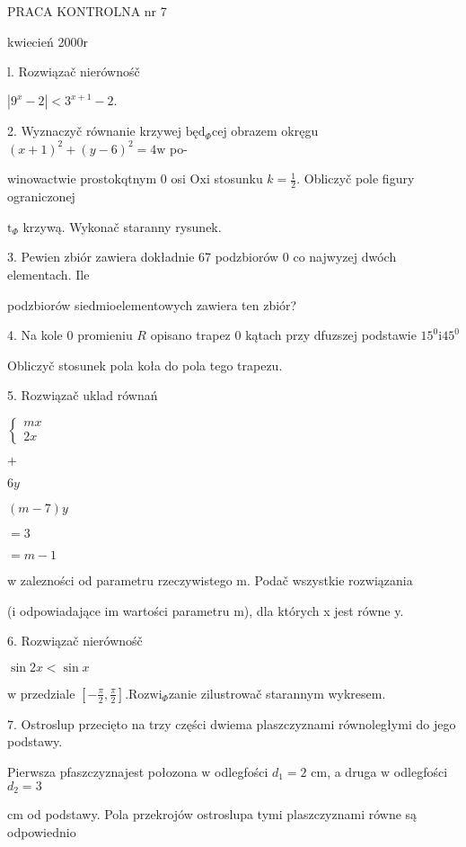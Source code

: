 \documentclass[a4paper,12pt]{article}
\begin{document}
PRACA KONTROLNA nr 7

kwiecień 2000r

l. Rozwiązač nierównośč

$|9^{x}-2|<3^{x+1}-2.$

2. Wyznaczyč równanie krzywej $\mathrm{b}\text{ę} \mathrm{d}_{\Phi}\mathrm{c}\mathrm{e}\mathrm{j}$ obrazem okręgu $(x+1)^{2}+(y-6)^{2}=4\mathrm{w}$ po-

winowactwie prostokqtnym $0$ osi $\mathrm{O}\mathrm{x}\mathrm{i}$ stosunku $k=\displaystyle \frac{1}{2}$. Obliczyč pole figury ograniczonej

$\mathrm{t}_{\Phi}$ krzywą. Wykonač staranny rysunek.

3. Pewien zbiór zawiera dokładnie 67 podzbiorów $0$ co najwyzej dwóch elementach. Ile

podzbiorów siedmioelementowych zawiera ten zbiór?

4. Na kole $0$ promieniu $R$ opisano trapez $0$ kątach przy dfuzszej podstawie $15^{0} \mathrm{i} 45^{0}$

Obliczyč stosunek pola koła do pola tego trapezu.

5. Rozwiązač uklad równań

$\left\{\begin{array}{l}
mx\\
2x
\end{array}\right.$

$+$

$6y$

$(m-7)y$

$=3$

$=m-1$

w zalezności od parametru rzeczywistego m. Podač wszystkie rozwiązania

(i odpowiadające im wartości parametru m), dla których x jest równe y.

6. Rozwiązač nierównośč

$\sin 2x<\sin x$

$\mathrm{w}$ przedziale $[-\displaystyle \frac{\pi}{2},\frac{\pi}{2}]. \mathrm{R}\mathrm{o}\mathrm{z}\mathrm{w}\mathrm{i}_{\Phi}$zanie zilustrowač starannym wykresem.

7. Ostroslup przecięto na trzy części dwiema plaszczyznami równoległymi do jego podstawy.

Pierwsza pfaszczyznajest połozona $\mathrm{w}$ odlegfości $d_{1} =2$ cm, a druga $\mathrm{w}$ odlegfości $d_{2}=3$

cm od podstawy. Pola przekrojów ostroslupa tymi plaszczyznami równe są odpowiednio
\end{document}
